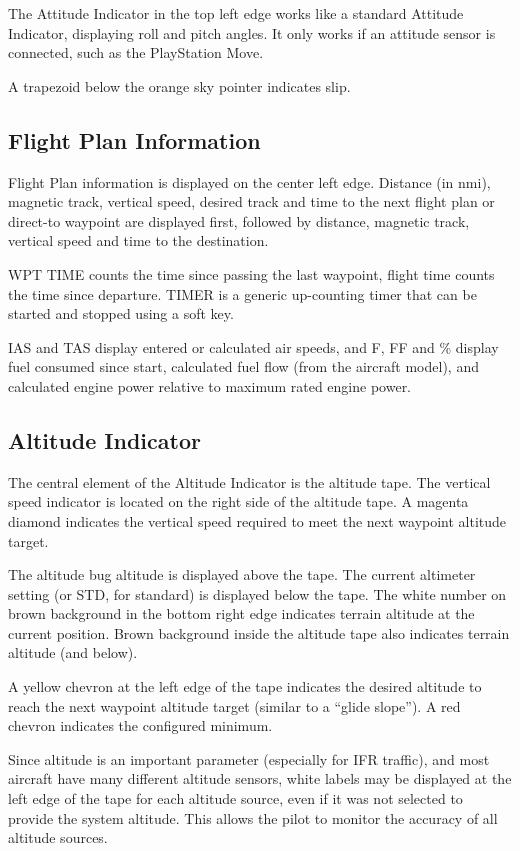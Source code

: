 \documentclass[a4paper,10pt,pdftex]{article}
\begin{document}
The Attitude Indicator in the top left edge works like a standard
Attitude Indicator, displaying roll and pitch angles. It only works if
an attitude sensor is connected, such as the PlayStation Move.

A trapezoid below the orange sky pointer indicates slip.

\subsection{Flight Plan Information}

Flight Plan information is displayed on the center left edge. Distance
(in nmi), magnetic track, vertical speed, desired track and time to
the next flight plan or direct-to waypoint are displayed first,
followed by distance, magnetic track, vertical speed and time to the
destination.

WPT TIME counts the time since passing the last waypoint, flight time
counts the time since departure. TIMER is a generic up-counting timer
that can be started and stopped using a soft key.

IAS and TAS display entered or calculated air speeds, and F, FF and \%
display fuel consumed since start, calculated fuel flow (from the
aircraft model), and calculated engine power relative to maximum rated
engine power.

\subsection{Altitude Indicator}

The central element of the Altitude Indicator is the altitude
tape. The vertical speed indicator is located on the right side of the
altitude tape. A magenta diamond indicates the vertical speed required
to meet the next waypoint altitude target.

The altitude bug altitude is displayed above the tape. The current
altimeter setting (or STD, for standard) is displayed below the
tape. The white number on brown background in the bottom right edge
indicates terrain altitude at the current position. Brown background
inside the altitude tape also indicates terrain altitude (and below).

A yellow chevron at the left edge of the tape indicates the desired
altitude to reach the next waypoint altitude target (similar to a
``glide slope''). A red chevron indicates the configured minimum.

Since altitude is an important parameter (especially for IFR traffic),
and most aircraft have many different altitude sensors, white labels
may be displayed at the left edge of the tape for each altitude
source, even if it was not selected to provide the system
altitude. This allows the pilot to monitor the accuracy of all
altitude sources.
\end{document}
